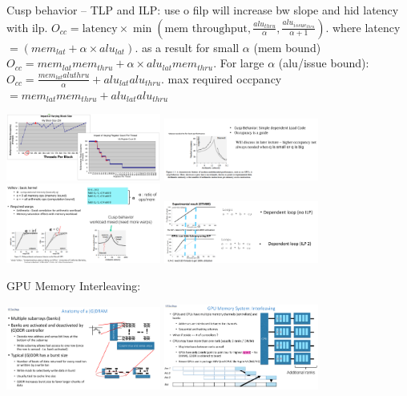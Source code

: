 \documentclass[letter,8pt,landscape]{article}
\begin{document}
\begin{multicols}{3}
  Cusp behavior – TLP and ILP: use o filp will increase bw slope and hid latency
  with ilp. 
  $O_{cc} = \text{latency} \times \min(\text{mem throughput},
  \frac{alu_{thru}}{\alpha}, \frac{alu_{issue_{thru}}}{\alpha + 1})$. where
  latency $= (mem_{lat} + \alpha \times alu_{lat})$. as a result for small
  $\alpha$ (mem bound) $O_{cc} = mem_{lat}mem_{thru} + \alpha \times
  alu_{lat}mem_{thru}$. For large $\alpha$ (alu/issue bound): $O_{cc} =
  \frac{mem_{lat}alu{thru}}{\alpha} +  alu_{lat}alu_{thru}$. max required
  occpancy $= mem_{lat}mem_{thru} + alu_{lat}alu_{thru}$
  \begin{center}
    \includegraphics[width=2in]{images/occupancy-drop.jpg}
    \includegraphics[width=2in]{images/cusp.jpg}
    \includegraphics[width=2in]{images/gpu-hit-lat.jpg}
    \includegraphics[width=2in]{images/ilp-thru.jpg}
  \end{center}

  GPU Memory Interleaving:
  \begin{center}
    \includegraphics[width=2in]{images/gdram.jpg}
    \includegraphics[width=2in]{images/interleaving.jpg}
  \end{center}


\end{multicols}
\end{document}
